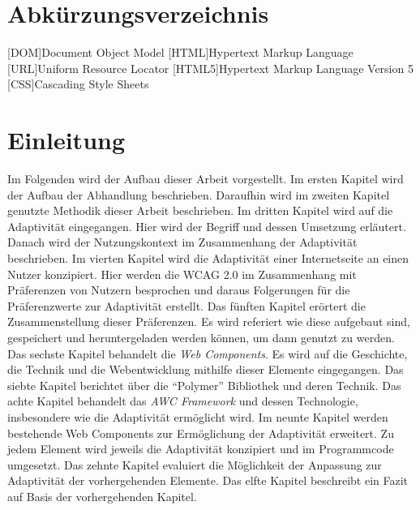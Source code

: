 \documentclass[12pt, paper=a4, bibtotoc, toc=listof, headsepline=true, numbers=endperiod]{scrreprt}
\begin{document}
\chapter*{Abkürzungsverzeichnis}
\begin{acronym}
	[DOM]{Document Object Model}
	[HTML]{Hypertext Markup Language}
	[URL]{Uniform Resource Locator}
	[HTML5]{Hypertext Markup Language Version 5}
	[CSS]{Cascading Style Sheets}
\end{acronym}

\tableofcontents



\chapter{Einleitung}
Im Folgenden wird der Aufbau dieser Arbeit vorgestellt. Im ersten Kapitel wird der Aufbau der Abhandlung beschrieben. Daraufhin wird im zweiten Kapitel genutzte Methodik dieser Arbeit beschrieben. Im dritten Kapitel wird auf die Adaptivität eingegangen. Hier wird der Begriff und dessen Umsetzung erläutert. Danach wird der Nutzungskontext im Zusammenhang der Adaptivität beschrieben. Im vierten Kapitel wird die Adaptivität einer Internetseite an einen Nutzer konzipiert. Hier werden die \ac{WCAG 2.0} im Zusammenhang mit Präferenzen von Nutzern besprochen und daraus Folgerungen für die Präferenzwerte zur Adaptivität erstellt. Das fünften Kapitel erörtert die Zusammenstellung dieser Präferenzen. Es wird referiert wie diese aufgebaut sind, gespeichert und heruntergeladen werden können, um dann genutzt zu werden. Das sechste Kapitel behandelt die \emph{Web Components}. Es wird auf die Geschichte, die Technik und die Webentwicklung mithilfe dieser Elemente eingegangen. Das siebte Kapitel berichtet über die \enquote{Polymer} Bibliothek und deren Technik. Das achte Kapitel behandelt das \emph{AWC Framework} und dessen Technologie, insbesondere wie die Adaptivität ermöglicht wird. Im neunte Kapitel werden bestehende Web Components zur Ermöglichung der Adaptivität erweitert. Zu jedem Element wird jeweils die Adaptivität konzipiert und im Programmcode umgesetzt. Das zehnte Kapitel evaluiert die Möglichkeit der Anpassung zur Adaptivität der vorhergehenden Elemente. Das elfte Kapitel beschreibt ein Fazit auf Basis der vorhergehenden Kapitel. 
\end{document}
